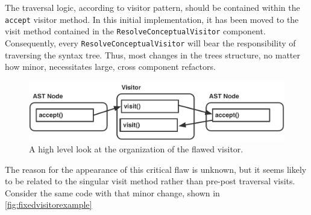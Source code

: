 \documentclass[times]{speauth}
\begin{document}
The traversal logic, according to visitor pattern, should be contained within the \texttt{accept} visitor method. In this initial implementation, it has been moved to the visit method contained in the \texttt{ResolveConceptualVisitor} component. Consequently, every \texttt{ResolveConceptualVisitor} will bear the responsibility of traversing the syntax tree. Thus, most changes in the trees structure, no matter how minor, necessitates large, cross component refactors.

\begin{figure}[!htb]
\centering
\includegraphics[scale=.60]{figures/flawed_visitor_organization.pdf}
\caption{A high level look at the organization of the flawed visitor.}
\label{fig:flawedvisitororganization}
\end{figure}

The reason for the appearance of this critical flaw is unknown, but it seems likely to be related to the singular visit method rather than pre-post traversal visits. Consider the same code with that minor change, shown in \ref{fig:fixedvisitorexample}
\end{document}
